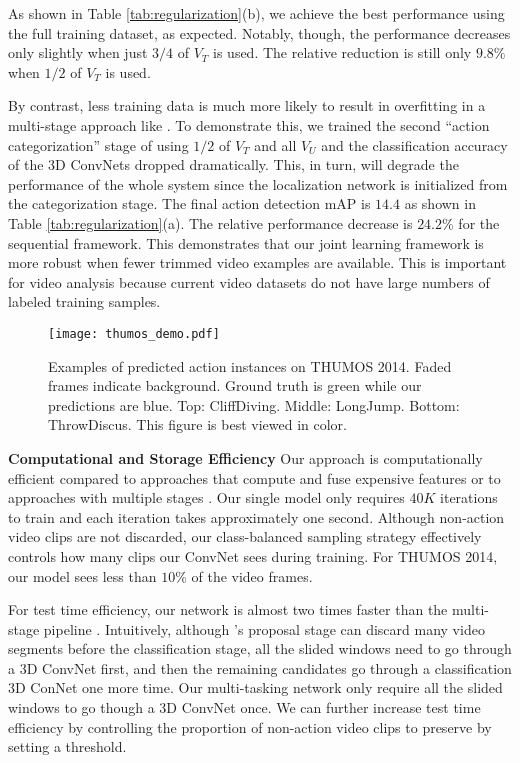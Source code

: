 \documentclass[10pt,twocolumn,letterpaper]{article}
\begin{document}
As shown in Table \ref{tab:regularization}(b), we achieve the best performance using the full training dataset, as expected. Notably, though, the performance decreases only slightly when just $3/4$ of $V_{T}$ is used. The relative reduction is still only $9.8\%$ when $1/2$ of $V_{T}$ is used. 

By contrast, less training data is much more likely to result in overfitting in a multi-stage approach like \cite{scnn_shou_wang_chang_cvpr16}. To demonstrate this, we trained the second ``action categorization'' stage of \cite{scnn_shou_wang_chang_cvpr16} using $1/2$ of $V_{T}$ and all $V_{U}$ and the classification accuracy of the 3D ConvNets dropped dramatically. This, in turn, will degrade the performance of the whole system since the localization network is initialized from the categorization stage. The final action detection mAP is $14.4$ as shown in Table \ref{tab:regularization}(a). The relative performance decrease is $24.2\%$ for the sequential framework. This demonstrates that our joint learning framework is more robust when fewer trimmed video examples are available. This is important for video analysis because current video datasets do not have large numbers of labeled training samples. 

\begin{figure}[t]
	\centering
	\texttt{[image: thumos\_demo.pdf]}
	\vspace{-10ex}
	\caption{Examples of predicted action instances on THUMOS 2014. Faded frames indicate background. Ground truth is green while our predictions are blue. Top: CliffDiving. Middle: LongJump. Bottom: ThrowDiscus. This figure is best viewed in color. }
	\label{fig:thumosdemo}
\end{figure}

\noindent \textbf{Computational and Storage Efficiency}
Our approach is computationally efficient compared to approaches that compute and fuse expensive features \cite{learThumos2014} or to approaches with multiple stages \cite{scnn_shou_wang_chang_cvpr16,fast_temporal_action_proposal_fabian_cvpr16,frame_glimpse_yeung_cvpr16}. Our single model only requires $40K$ iterations to train and each iteration takes approximately one second. Although non-action video clips are not discarded, our class-balanced sampling strategy effectively controls how many clips our ConvNet sees during training. For THUMOS 2014, our model sees less than $10\%$ of the video frames. 

For test time efficiency, our network is almost two times faster than the multi-stage pipeline \cite{scnn_shou_wang_chang_cvpr16}. Intuitively, although \cite{scnn_shou_wang_chang_cvpr16}'s proposal stage can discard many video segments before the classification stage, all the slided windows need to go through a 3D ConvNet first, and then the remaining candidates go through a classification 3D ConNet one more time. Our multi-tasking network only require all the slided windows to go though a 3D ConvNet once. 
We can further increase test time efficiency by controlling the proportion of non-action video clips to preserve by setting a threshold. 
\end{document}
